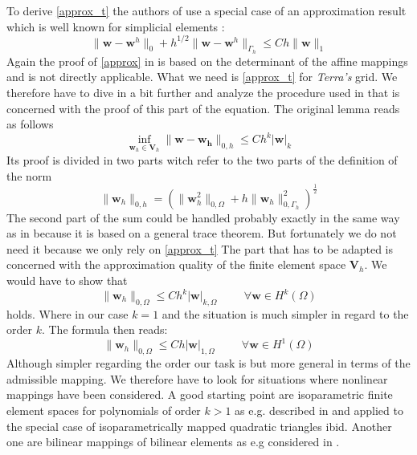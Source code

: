 \documentclass[times]{fldauth}
\newcommand{\mb}{\mathbf}
\begin{document}
\label{chap:terralemmata}
To derive \eqref{approx_t} the authors of \cite{bochev2007stabilization} use a special case of an approximation result which is well known for simplicial elements \cite[p.~217]{GiraultRaviart}:
\begin{equation}
\label{approx}
\| \mb w -\mb w^h \|_0 +h^{1/2} \|\mb w -\mb w^h\|_{\Gamma_h} \le C h \| \mb w\|_1
\end{equation}
Again the proof of \eqref{approx} in  \cite{GiraultRaviart} is based on the determinant of the affine mappings and is not directly applicable.
What we need is \eqref{approx_t} 
for \emph{Terra's} grid.
We therefore have to dive in a bit further and analyze the procedure used in  \cite{GiraultRaviart} that is concerned with the proof of this part of the equation.
The original lemma reads as follows
\begin{equation}
\inf_{\mb w_h \in \mb V_h} \| \mb w-\mb{w_h} \|_{0,h} \le C h^k |\mb w|_{k}
\end{equation}
Its proof is divided in two parts witch refer to the two parts of the definition of the norm
\begin{equation}
\| \mb w_h \|_{0,h}= \left( \| \mb {w}_h^2\|_{0,\Omega} + h \| \mb{w}_h \|^2_{0,\Gamma_h}  \right)^{\frac{1}{2}}
\end{equation}
The second part of the sum could be handled probably exactly in the same way as in  \cite{GiraultRaviart} because it is based on a general trace theorem.
But fortunately we do not need it because we only rely on  \eqref{approx_t}
The part that has to be adapted is concerned with the approximation quality of the finite element space $\mb V_h$.
We would have to show  that 
\begin{equation}
\label{ph_approx}
 \| \mb {w}_h \|_{0,\Omega} \le C h^k |\mb w|_{k,\Omega}\hspace{1cm} \forall \mb w \in H^k(\Omega)
\end{equation} holds.
Where in  our case $k=1$ and the situation is much simpler in regard to the order $k$.
The formula then reads:
\begin{equation}
 \| \mb {w}_h \|_{0,\Omega} \le C h |\mb w|_{1,\Omega} \hspace{1cm} \forall \mb w \in H^1(\Omega)
\end{equation}
Although simpler regarding the order our task is but more general in terms of the admissible mapping.
We therefore have to look for situations where nonlinear mappings have been considered. A good starting point are isoparametric finite element spaces for polynomials of order $k>1$ as e.g. described in  \cite{ciarlet1994handbook} and applied to the special case of isoparametrically mapped quadratic triangles ibid.  Another one are bilinear mappings of bilinear elements as e.g considered in  \cite{GiraultRaviart}. 
\end{document}
